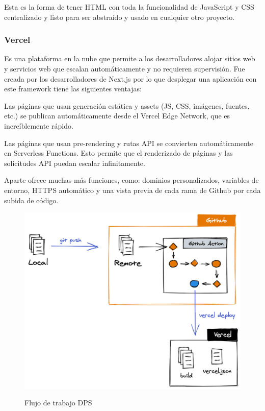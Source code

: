 \documentclass[12pt,twoside,titlepage]{report}
\begin{document}
Esta es la forma de tener HTML con toda la funcionalidad de JavaScript y CSS centralizado y listo para ser abstraído y usado en cualquier otro proyecto.

\subsubsection{Vercel}

Es una plataforma en la nube que permite a los desarrolladores alojar sitios web y servicios web que escalan automáticamente y no requieren supervisión. Fue creada por los desarrolladores de Next.js por lo que desplegar una aplicación con este framework tiene las siguientes ventajas:

\begin{compactitem}
    \item Las páginas que usan generación estática y assets (JS, CSS, imágenes, fuentes, etc.) se publican automáticamente desde el Vercel Edge Network, que es increíblemente rápido.
    \item Las páginas que usan pre-rendering y rutas API se convierten automáticamente en Serverless Functions. Esto permite que el renderizado de páginas y las solicitudes API puedan escalar infinitamente.
\end{compactitem}

Aparte ofrece muchas más funciones, como: dominios personalizados, variables de entorno, HTTPS automático y una vista previa de cada rama de Github por cada subida de código.

\begin{figure}[H]
    \centering
    \includegraphics[scale=0.2]{Vercel/DPS}
    \label{fig:vercel_workflow}
    \caption{Flujo de trabajo DPS}
\end{figure}
\end{document}
